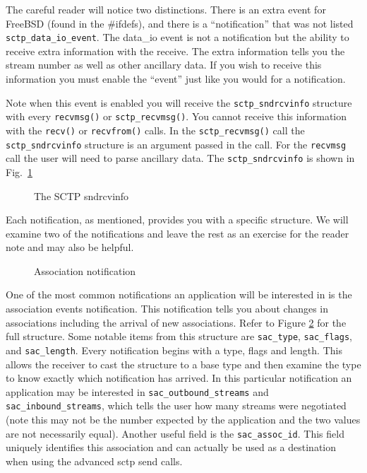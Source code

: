 \documentclass[conference]{IEEEtran}
\begin{document}
The careful reader will notice two distinctions. There is an extra event
for FreeBSD (found in the \#ifdefs), and there is a ``notification'' that was 
not listed \texttt{sctp\_data\_io\_event}. The data\_io event is not a 
notification but the ability to receive extra information with the receive.
The extra information tells you the stream number as well as other
ancillary data. If you wish to receive this information you must enable
the ``event'' just like  you would for a notification. 

Note when this event is enabled you will receive the \texttt{sctp\_sndrcvinfo}
structure with every
\texttt{recvmsg()} or \texttt{sctp\_recvmsg()}. You cannot receive
this information with the \texttt{recv()} or \texttt{recvfrom()} calls. In the
\texttt{sctp\_recvmsg()} call the \texttt{sctp\_sndrcvinfo}  structure is an
argument passed in the call. For the \texttt{recvmsg} call the user will
need to parse ancillary data. The \texttt{sctp\_sndrcvinfo}  is shown in Fig.~\ref{fig:sndrcv}
\begin{figure}

\caption{The SCTP sndrcvinfo}
\label{fig:sndrcv}
\end{figure}

Each notification, as mentioned, provides you with a specific structure. 
We will examine two of the notifications and leave the rest
as an exercise for the reader note \cite{socketdraft} and \cite{stevensapi} may
also be helpful.

\begin{figure}

\caption{Association notification}
\label{fig:assocnotify}
\end{figure}

One of the most common notifications an application will be interested in is
the association events notification. This notification tells you about changes in
associations including the arrival of new associations.  Refer to Figure \ref{fig:assocnotify} for the full structure.
Some notable items from this structure are \texttt{sac\_type}, \texttt{sac\_flags},
and \texttt{sac\_length}. Every notification
begins with a type, flags and length. This allows the receiver to cast the structure to a base type and then
examine the type to know exactly which notification has arrived.
In this particular notification an application may be interested in
\texttt{sac\_outbound\_streams} and \texttt{sac\_inbound\_streams}, which tells
the user how many streams were negotiated (note this may not be the number expected by
the application and the two values are not necessarily equal). Another useful field is the
\texttt{sac\_assoc\_id}.
This field uniquely identifies this association and can actually be used as a destination
when using the advanced sctp send calls.
\end{document}
